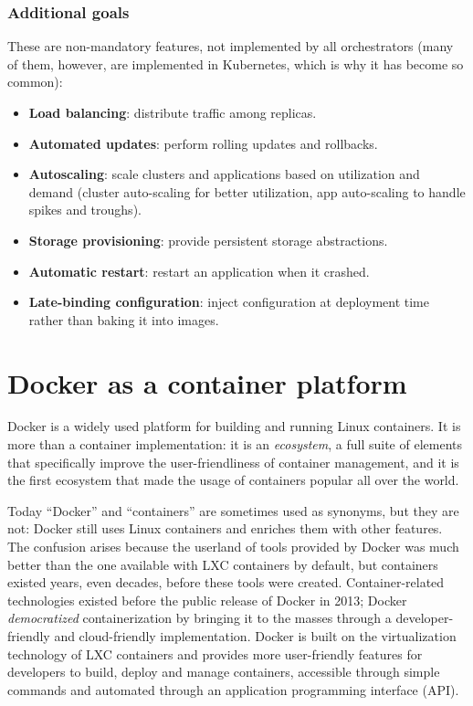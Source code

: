 \subsubsection*{Additional goals}

These are non-mandatory features, not implemented by all orchestrators (many of them, however, are implemented in Kubernetes, which is why it has become so common):

\begin{itemize}
\item \textbf{Load balancing}: distribute traffic among replicas.
\item \textbf{Automated updates}: perform rolling updates and rollbacks.
\item \textbf{Autoscaling}: scale clusters and applications based on utilization and demand (cluster auto-scaling for better utilization, app auto-scaling to handle spikes and troughs).
\item \textbf{Storage provisioning}: provide persistent storage abstractions.
\item \textbf{Automatic restart}: restart an application when it crashed.
\item \textbf{Late-binding configuration}: inject configuration at deployment time rather than baking it into images.
\end{itemize}

\section{Docker as a container platform}

Docker is a widely used platform for building and running Linux containers. It is more than a container implementation: it is an \emph{ecosystem}, a full suite of elements that specifically improve the user-friendliness of container management, and it is the first ecosystem that made the usage of containers popular all over the world.

Today ``Docker'' and ``containers'' are sometimes used as synonyms, but they are not: Docker still uses Linux containers and enriches them with other features. The confusion arises because the userland of tools provided by Docker was much better than the one available with LXC containers by default, but containers existed years, even decades, before these tools were created. Container-related technologies existed before the public release of Docker in 2013; Docker \emph{democratized} containerization by bringing it to the masses through a developer-friendly and cloud-friendly implementation. Docker is built on the virtualization technology of LXC containers and provides more user-friendly features for developers to build, deploy and manage containers, accessible through simple commands and automated through an application programming interface (API).

